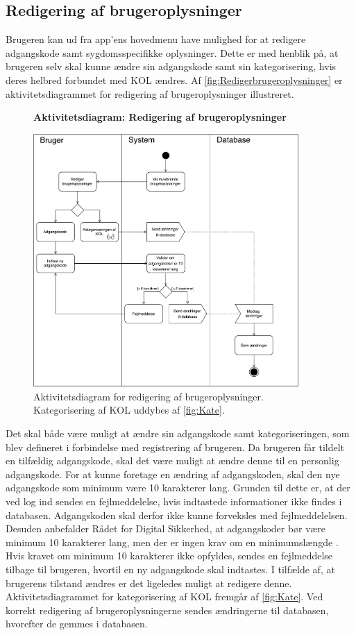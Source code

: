 \subsection*{Redigering af brugeroplysninger} \label{sec:redigrering}
Brugeren kan ud fra app'ens hovedmenu have mulighed for at redigere adgangskode samt sygdomsspecifikke oplysninger. Dette er med henblik på, at brugeren selv skal kunne ændre sin adgangskode samt sin kategorisering, hvis deres helbred forbundet med KOL ændres. Af \autoref{fig:Redigerbrugeroplysninger} er aktivitetsdiagrammet for redigering af brugeroplysninger illustreret. 

\begin{figure}[H]
\centering
\textbf{Aktivitetsdiagram: Redigering af brugeroplysninger}\par\medskip
\includegraphics[width=0.9\textwidth]{figures/aktivitetsdiagram/Redigerbrugeroplysninger}
\caption{Aktivitetsdiagram for redigering af brugeroplysninger. Kategorisering af KOL uddybes af \autoref{fig:Kate}.}
\label{fig:Redigerbrugeroplysninger}
\end{figure}

\noindent
Det skal både være muligt at ændre sin adgangskode samt kategoriseringen, som blev defineret i forbindelse med registrering af brugeren. Da brugeren får tildelt en tilfældig adgangskode, skal det være muligt at ændre denne til en personlig adgangskode. For at kunne foretage en ændring af adgangskoden, skal den nye adgangskode som minimum være 10 karakterer lang. Grunden til dette er, at der ved log ind sendes en fejlmeddelelse, hvis indtastede informationer ikke findes i databasen. Adgangskoden skal derfor ikke kunne forveksles med fejlmeddelelsen. Desuden anbefalder Rådet for Digital Sikkerhed, at adgangskoder bør være minimum 10 karakterer lang, men der er ingen krav om en minimumslængde \citep{sikkerhed2015}.
Hvis kravet om minimum 10 karakterer ikke opfyldes, sendes en fejlmeddelse tilbage til brugeren, hvortil en ny adgangskode skal indtastes. 
I tilfælde af, at brugerens tilstand ændres er det ligeledes muligt at redigere denne. Aktivitetsdiagrammet for kategorisering af KOL fremgår af \autoref{fig:Kate}.
Ved korrekt redigering af brugeroplysningerne sendes ændringerne til databasen, hvorefter de gemmes i databasen.